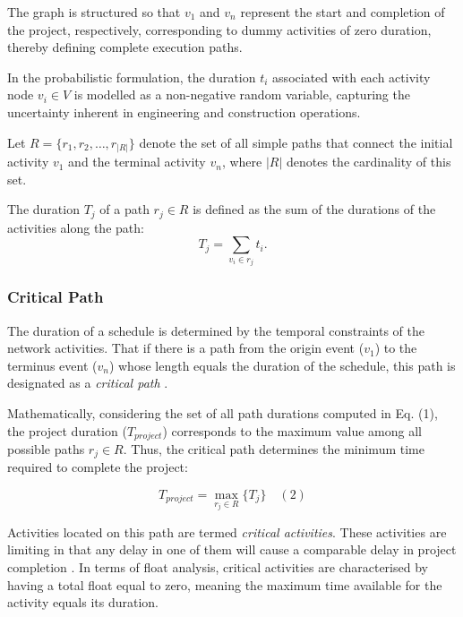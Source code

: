 The graph is structured so that \( v_1 \) and \( v_n \) represent the start and completion of the project, respectively, corresponding to dummy activities of zero duration, thereby defining complete execution paths.

In the probabilistic formulation, the duration \( t_i \) associated with each activity node \( v_i \in V \) is modelled as a non-negative random variable, capturing the uncertainty inherent in engineering and construction operations.

Let \( R = \{ r_1, r_2, \ldots, r_{|R|} \} \) denote the set of all simple paths that connect the initial activity \( v_1 \) and the terminal activity \( v_n \), where \( |R| \) denotes the cardinality of this set.

The duration \( T_j \) of a path \( r_j \in R \) is defined as the sum of the durations of the activities along the path:
\begin{equation}
T_j = \sum_{v_i \in r_j} t_i .
\label{eq:path_duration}
\end{equation}

\subsubsection{Critical Path}

The duration of a schedule is determined by the temporal constraints of the network activities. That if there is a path from the origin event ($v_1$) to the terminus event ($v_n$) whose length equals the duration of the schedule, this path is designated as a \textit{critical path} \citep{Kelley1961}.

Mathematically, considering the set of all path durations computed in Eq. (1), the project duration ($T_{project}$) corresponds to the maximum value among all possible paths $r_j \in R$. Thus, the critical path determines the minimum time required to complete the project:

\begin{equation}
T_{project} = \max_{r_j \in R} \{ T_j \} \quad (2)
\end{equation}

Activities located on this path are termed \textit{critical activities}. These activities are limiting in that any delay in one of them will cause a comparable delay in project completion \citep{Kelley1961}. In terms of float analysis, critical activities are characterised by having a total float equal to zero, meaning the maximum time available for the activity equals its duration.

